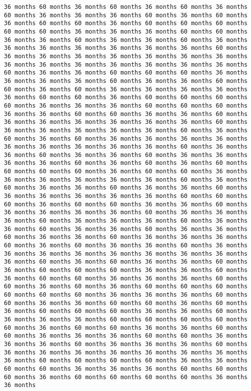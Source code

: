 \documentclass[11pt]{article}
\begin{document}
\begin{Verbatim}[commandchars=\\\{\}, frame=single, framerule=2mm, rulecolor=\color{outerrorbackground}]
36 months 60 months 36 months 60 months 36 months 60 months 36 months 60 months 36 months 36 months 36 months 60 months 36 months 60 months 36 months 60 months 60 months 36 months 60 months 60 months 60 months 60 months 60 months 36 months 36 months 36 months 60 months 60 months 36 months 36 months 60 months 36 months 36 months 60 months 36 months 36 months 36 months 36 months 36 months 36 months 36 months 60 months 36 months 36 months 36 months 36 months 36 months 36 months 36 months 36 months 36 months 36 months 36 months 36 months 36 months 36 months 60 months 36 months 36 months 60 months 60 months 60 months 36 months 36 months 36 months 36 months 60 months 36 months 36 months 60 months 60 months 36 months 60 months 36 months 36 months 36 months 36 months 36 months 60 months 60 months 36 months 60 months 60 months 60 months 60 months 36 months 36 months 36 months 60 months 60 months 60 months 36 months 36 months 60 months 60 months 36 months 36 months 60 months 36 months 36 months 36 months 36 months 36 months 36 months 60 months 36 months 36 months 36 months 36 months 36 months 60 months 36 months 60 months 36 months 60 months 36 months 36 months 36 months 36 months 36 months 36 months 36 months 36 months 36 months 60 months 36 months 36 months 60 months 36 months 36 months 60 months 36 months 36 months 36 months 36 months 60 months 36 months 60 months 36 months 60 months 60 months 60 months 60 months 36 months 60 months 60 months 36 months 36 months 36 months 36 months 36 months 36 months 60 months 36 months 60 months 36 months 36 months 60 months 36 months 36 months 60 months 36 months 36 months 36 months 36 months 36 months 60 months 60 months 60 months 36 months 60 months 60 months 36 months 36 months 60 months 36 months 36 months 36 months 36 months 60 months 36 months 36 months 36 months 60 months 36 months 36 months 36 months 60 months 36 months 36 months 60 months 36 months 36 months 60 months 36 months 36 months 60 months 36 months 36 months 60 months 36 months 36 months 36 months 60 months 36 months 60 months 36 months 36 months 60 months 36 months 36 months 36 months 36 months 36 months 36 months 36 months 36 months 36 months 60 months 36 months 60 months 36 months 36 months 60 months 36 months 60 months 60 months 60 months 36 months 36 months 60 months 36 months 60 months 60 months 36 months 36 months 36 months 60 months 60 months 36 months 60 months 36 months 60 months 60 months 60 months 60 months 60 months 60 months 36 months 36 months 36 months 60 months 60 months 36 months 36 months 60 months 60 months 36 months 60 months 36 months 60 months 60 months 60 months 36 months 36 months 60 months 36 months 36 months 36 months 60 months 60 months 60 months 60 months 60 months 36 months 60 months 60 months 36 months 36 months 60 months 60 months 36 months 36 months 36 months 60 months 60 months 36 months 36 months 36 months 60 months 36 months 36 months 36 months 60 months 36 months 36 months 36 months 36 months 36 months 36 months 36 months 36 months 60 months 60 months 60 months 60 months 36 months 36 months 60 months 60 months 36 months 36 months 36 months 60 months 60 months 60 months 36 months 60 months 60 months 60 months 60 months 36 months 36 months 
\end{Verbatim}
\end{document}
